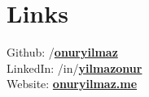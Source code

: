 \section{Links} 
\sectionspacehalf

Github: /\href{https://github.com/onuryilmaz}{\bf onuryilmaz} \\
LinkedIn: /in/\href{https://tr.linkedin.com/in/yilmazonur}{\bf yilmazonur} \\
Website: \href{https://onuryilmaz.me}{\bf onuryilmaz.me}

\sectionspacehalf
